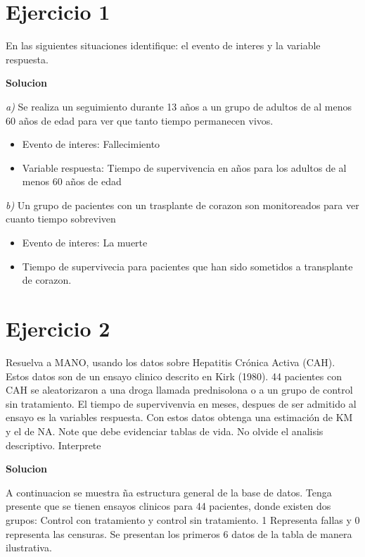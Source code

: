 \documentclass[
  12pt,
  letterpaper,
]{article}
\author{}
\date{\vspace{-2.5em}}
\begin{document}

\thispagestyle{empty}
\tableofcontents
\newpage

\pagestyle{myheadings}
\setcounter{page}{4}

\section{Ejercicio 1}

En las siguientes situaciones identifique: el evento de interes y la
variable respuesta.

\textbf{Solucion}

\emph{a)} Se realiza un seguimiento durante 13 años a un grupo de
adultos de al menos 60 años de edad para ver que tanto tiempo permanecen
vivos.

\begin{itemize}
\item
  Evento de interes: Fallecimiento
\item
  Variable respuesta: Tiempo de supervivencia en años para los adultos
  de al menos 60 años de edad
\end{itemize}

\emph{b)} Un grupo de pacientes con un trasplante de corazon son
monitoreados para ver cuanto tiempo sobreviven

\begin{itemize}
\item
  Evento de interes: La muerte
\item
  Tiempo de supervivecia para pacientes que han sido sometidos a
  transplante de corazon.
\end{itemize}

\section{Ejercicio 2}

Resuelva a MANO, usando los datos sobre Hepatitis Crónica Activa (CAH).
Estos datos son de un ensayo clinico descrito en Kirk (1980). 44
pacientes con CAH se aleatorizaron a una droga llamada prednisolona o a
un grupo de control sin tratamiento. El tiempo de supervivenvia en
meses, despues de ser admitido al ensayo es la variables respuesta. Con
estos datos obtenga una estimación de KM y el de NA. Note que debe
evidenciar tablas de vida. No olvide el analisis descriptivo. Interprete

\textbf{Solucion}

A continuacion se muestra ña estructura general de la base de datos.
Tenga presente que se tienen ensayos clinicos para 44 pacientes, donde
existen dos grupos: Control con tratamiento y control sin tratamiento. 1
Representa fallas y 0 representa las censuras. Se presentan los primeros
6 datos de la tabla de manera ilustrativa.
\end{document}
